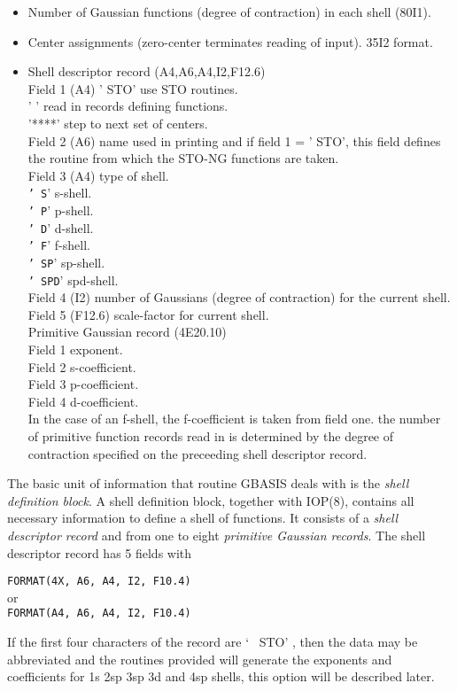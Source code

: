 \begin{itemize}
\item Number of Gaussian functions  (degree of contraction) in each shell
(80I1).
\item Center assignments (zero-center terminates reading of input).  35I2
format.
\item Shell descriptor record (A4,A6,A4,I2,F12.6)  \\
Field 1 (A4)  ' STO' use STO routines.  \\
'    ' read in records defining functions.  \\
'****' step to next set of centers.  \\
Field 2 (A6)  name used in printing and if field 1 = ' STO', this
field defines the routine from which the STO-NG
functions are taken.  \\
Field 3 (A4)  type of shell.  \\
{\tt '   S}'  s-shell.  \\
{\tt '   P}'  p-shell.  \\
{\tt '   D}'  d-shell.  \\
{\tt '   F}'  f-shell.  \\
{\tt '  SP}'  sp-shell.  \\
{\tt ' SPD}'  spd-shell.  \\
Field 4 (I2)  number of Gaussians (degree of contraction) for the
current shell.  \\
Field 5 (F12.6)  scale-factor for current shell. \\
Primitive Gaussian record (4E20.10)  \\
Field 1  exponent.  \\
Field 2  s-coefficient.  \\
Field 3  p-coefficient.  \\
Field 4  d-coefficient.  \\
In the case of an f-shell, the f-coefficient is taken from field one.
the number of primitive function records read in is determined by the
degree of contraction specified on the preceeding shell descriptor
record.
\end{itemize}


The basic unit of information that routine GBASIS deals with is the
{\em shell definition block}.  A shell definition block, together with IOP(8),
contains all necessary information to define a shell of functions.
It consists of a {\em shell descriptor record} and from one to eight 
{\em primitive
Gaussian records}.  The shell descriptor record has 5 fields with 
\begin{center}
{\tt FORMAT(4X, A6, A4, I2, F10.4) } \\
or \\
{\tt FORMAT(A4, A6, A4, I2, F10.4) } 
\end{center}
If the first four characters of the record are ` \ STO' ,
then the data may be abbreviated and the routines provided will
generate the exponents and coefficients for 1s 2sp 3sp 3d and 4sp
shells, this option will be described later.

